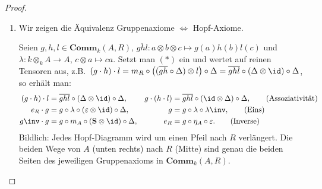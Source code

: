\documentclass[11pt]{article}
\newcommand{\Comm}{\mathbf{Comm}}
\newcommand{\Sbold}{\mathbf{S}}
\begin{document}
\begin{proof} \mbox{}
    \begin{enumerate}
        \item Wir zeigen die Äquivalenz Gruppenaxiome $\Longleftrightarrow$ Hopf-Axiome. \par 
            Seien $g,h,l\in\Comm_k(A,R)$,
            $\overline{ghl}: a\otimes b\otimes c\mapsto g(a)h(b)l(c)$ und $\lambda: k\otimes_k A\to A$, $c\otimes a\mapsto ca$.
            Setzt man $(*)$ ein und wertet auf reinen Tensoren aus, z.B.\
            $(g\cdot h)\cdot l = m_R\circ\big((\overline{gh}\circ\Delta)\otimes l\big)\circ\Delta = \overline{ghl}\circ(\Delta\otimes\id)\circ\Delta$, so erhält man:
            \begin{align*}
                (g\cdot h)\cdot l &= \overline{ghl}\circ(\Delta\otimes\id)\circ\Delta, & g\cdot(h\cdot l) &= \overline{ghl}\circ(\id\otimes\Delta)\circ\Delta, \tag{Assoziativität}\\
                e_R\cdot g &= g\circ\lambda\circ(\varepsilon\otimes\id)\circ\Delta, & g &= g\circ\lambda\circ\lambda\inv, \tag{Eins}\\
                g\inv\cdot g &= g\circ m_A\circ(\Sbold\otimes\id)\circ\Delta, & e_R &= g\circ \eta_A\circ\varepsilon. \tag{Inverse}
            \end{align*}
            Bildlich: Jedes Hopf-Diagramm wird um einen Pfeil nach $R$ verlängert. Die beiden Wege von $A$ (unten rechts) nach $R$ (Mitte)
            sind genau die beiden Seiten des jeweiligen Gruppenaxioms in $\Comm_k(A,R)$.
            \vspace{-0.5cm}
            \begin{center}
\end{center}
\end{enumerate}
\end{proof}
\end{document}
